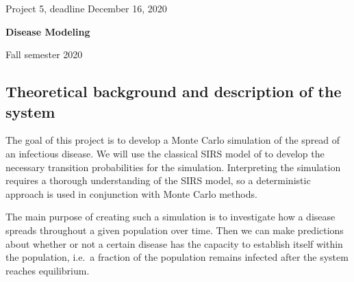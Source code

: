 \documentclass[%
oneside,                 %
final,                   %
10pt]{article}
\begin{document}

\newcommand{\exercisesection}[1]{\subsection*{#1}}






\thispagestyle{empty}

\begin{center}
{\LARGE\bf
\begin{spacing}{1.25}
Project 5, deadline  December 16, 2020
\end{spacing}
}
\end{center}


\begin{center}
{\bf Disease Modeling${}^{}$} \\ [0mm]
\end{center}

\begin{center}
\end{center}
    

\begin{center}
Fall semester 2020
\end{center}

\vspace{1cm}


\subsection{Theoretical background and description of the system}

The goal of this project is to develop a Monte Carlo simulation of
the spread of an infectious disease. We will use the classical SIRS model of
to develop the necessary transition
probabilities for the simulation. Interpreting the simulation requires
a thorough understanding of the SIRS model, so a deterministic
approach is used in conjunction with Monte Carlo methods. 

The main purpose of creating such a simulation is to investigate how a
disease spreads throughout a given population over time. Then we can
make predictions about whether or not a certain disease has the
capacity to establish itself within the population, i.e.~a fraction of
the population remains infected after the system reaches
equilibrium. 
\end{document}
